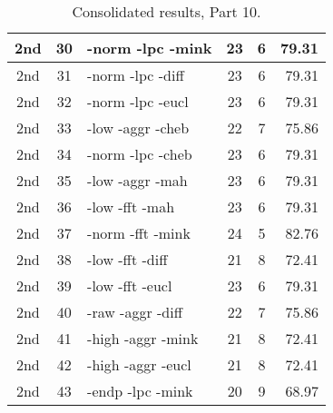 \begin{table}
\begin{minipage}[b]{\textwidth}
\begin{tabular}{|c|c|l|c|c|r|}
2nd & 30 & -norm -lpc -mink  & 23 & 6 & 79.31\\ \hline
2nd & 31 & -norm -lpc -diff  & 23 & 6 & 79.31\\ \hline
2nd & 32 & -norm -lpc -eucl  & 23 & 6 & 79.31\\ \hline
2nd & 33 & -low -aggr -cheb  & 22 & 7 & 75.86\\ \hline
2nd & 34 & -norm -lpc -cheb  & 23 & 6 & 79.31\\ \hline
2nd & 35 & -low -aggr -mah  & 23 & 6 & 79.31\\ \hline
2nd & 36 & -low -fft -mah  & 23 & 6 & 79.31\\ \hline
2nd & 37 & -norm -fft -mink  & 24 & 5 & 82.76\\ \hline
2nd & 38 & -low -fft -diff  & 21 & 8 & 72.41\\ \hline
2nd & 39 & -low -fft -eucl  & 23 & 6 & 79.31\\ \hline
2nd & 40 & -raw -aggr -diff  & 22 & 7 & 75.86\\ \hline
2nd & 41 & -high -aggr -mink  & 21 & 8 & 72.41\\ \hline
2nd & 42 & -high -aggr -eucl  & 21 & 8 & 72.41\\ \hline
2nd & 43 & -endp -lpc -mink  & 20 & 9 & 68.97\\ \hline
\end{tabular}
\end{minipage}
\caption{Consolidated results, Part 10.}
\label{tab:results10}
\end{table}

